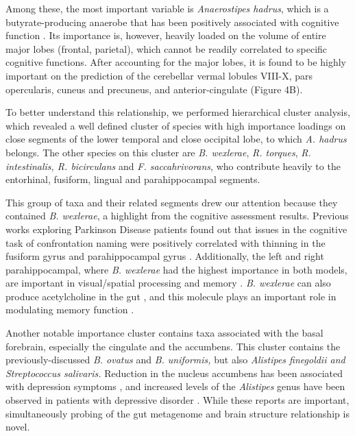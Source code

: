 \documentclass[a4paper]{article}
\begin{document}
Among these, the most important variable is \emph{Anaerostipes hadrus},
which is a butyrate-producing anaerobe that has been positively
associated with cognitive function
\cite{kantGenomeSequenceButyrateProducing2015,liCorrelationsGutMicrobiota2022}.
Its importance is, however, heavily loaded on the volume
of entire major lobes (frontal, parietal), which cannot be readily
correlated to specific cognitive functions. After accounting for the
major lobes, it is found to be highly important on the prediction of the
cerebellar vermal lobules VIII-X, pars opercularis, cuneus and
precuneus, and anterior-cingulate (Figure 4B).

To better understand this relationship, we performed hierarchical
cluster analysis, which revealed a well defined cluster of species with
high importance loadings on close segments of the lower temporal and
close occipital lobe, to which \emph{A. hadrus} belongs. The other
species on this cluster are \emph{B. wexlerae}, \emph{R. torques},
\emph{R. intestinalis, R. bicirculans} and \emph{F. saccahrivorans}, who
contribute heavily to the entorhinal, fusiform, lingual and
parahippocampal segments.

This group of taxa and their related segments drew our attention because
they contained \emph{B. wexlerae}, a highlight from the cognitive
assessment results. Previous works exploring Parkinson Disease patients
found out that issues in the cognitive task of confrontation naming were
positively correlated with thinning in the fusiform gyrus and
parahippocampal gyrus
\cite{pagonabarragaPatternRegionalCortical2013}.
Additionally, the left and right parahippocampal, where \emph{B.
wexlerae} had the highest importance in both models, are important in
visual/spatial processing and memory
\cite{aminoffRoleParahippocampalCortex2013}.
\emph{B. wexlerae} can also produce acetylcholine in the gut
\cite{hosomiOralAdministrationBlautia2022},
and this molecule plays an important role in modulating memory
function
\cite{haamCholinergicModulationHippocampal2017}.


Another notable importance cluster contains taxa associated with the
basal forebrain, especially the cingulate and the accumbens. This
cluster contains the previously-discussed \emph{B. ovatus} and \emph{B.
uniformis,} but also \emph{Alistipes finegoldii and Streptococcus
salivaris.} Reduction in the nucleus accumbens has been associated with
depression symptoms
\cite{wackerRoleNucleusAccumbens2009},
and increased levels of the \emph{Alistipes} genus have been
observed in patients with depressive disorder
\cite{jiangAlteredFecalMicrobiota2015}.
While these reports are important, simultaneously probing of the gut
metagenome and brain structure relationship is novel.
\end{document}

